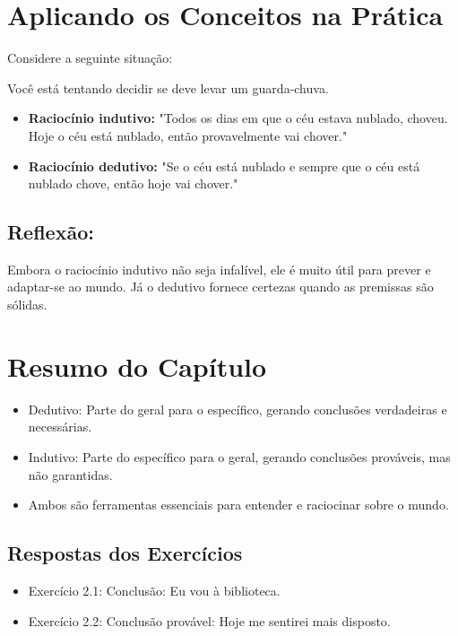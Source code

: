 \documentclass[a4paper,12pt]{book}
\begin{document}
\section{Aplicando os Conceitos na Prática}

Considere a seguinte situação:

Você está tentando decidir se deve levar um guarda-chuva.
\begin{itemize}
\item \textbf{Raciocínio indutivo:} "Todos os dias em que o céu estava nublado, choveu. Hoje o céu está nublado, então provavelmente vai chover."
\item \textbf{Raciocínio dedutivo:} "Se o céu está nublado e sempre que o céu está nublado chove, então hoje vai chover."
\end{itemize}

\subsection*{Reflexão:}

Embora o raciocínio indutivo não seja infalível, ele é muito útil para prever e adaptar-se ao mundo. Já o dedutivo fornece certezas quando as premissas são sólidas.

\newpage

\section{Resumo do Capítulo}

\begin{itemize}
\item Dedutivo: Parte do geral para o específico, gerando conclusões verdadeiras e necessárias.
\item Indutivo: Parte do específico para o geral, gerando conclusões prováveis, mas não garantidas.
\item Ambos são ferramentas essenciais para entender e raciocinar sobre o mundo.
\end{itemize}

\subsection*{Respostas dos Exercícios}

\begin{itemize}
\item Exercício 2.1: Conclusão: Eu vou à biblioteca.
\item Exercício 2.2: Conclusão provável: Hoje me sentirei mais disposto.
\end{itemize}
\end{document}

